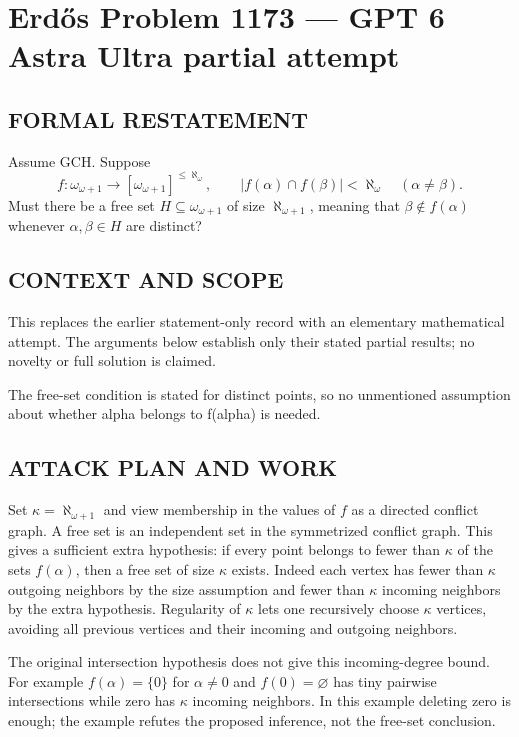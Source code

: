 \section*{Erd\H{o}s Problem 1173 --- GPT 6 Astra Ultra partial attempt}


\subsection*{FORMAL RESTATEMENT}
Assume GCH. Suppose
\[
f:\omega_{\omega+1}\longrightarrow[\omega_{\omega+1}]^{\leq\aleph_\omega},
\qquad |f(\alpha)\cap f(\beta)|<\aleph_\omega\quad(\alpha\ne\beta).
\]
Must there be a free set $H\subseteq\omega_{\omega+1}$ of size $\aleph_{\omega+1}$, meaning that $\beta\notin f(\alpha)$ whenever $\alpha,\beta\in H$ are distinct?

\subsection*{CONTEXT AND SCOPE}
This replaces the earlier statement-only record with an elementary mathematical attempt. The arguments below establish only their stated partial results; no novelty or full solution is claimed.

The free-set condition is stated for distinct points, so no unmentioned assumption about whether alpha belongs to f(alpha) is needed.

\subsection*{ATTACK PLAN AND WORK}
Set $\kappa=\aleph_{\omega+1}$ and view membership in the values of $f$ as a
directed conflict graph. A free set is an independent set in the symmetrized
conflict graph. This gives a sufficient extra hypothesis: if every point belongs
to fewer than $\kappa$ of the sets $f(\alpha)$, then a free set of size $\kappa$
exists. Indeed each vertex has fewer than $\kappa$ outgoing neighbors by the
size assumption and fewer than $\kappa$ incoming neighbors by the extra hypothesis.
Regularity of $\kappa$ lets one recursively choose $\kappa$ vertices, avoiding
all previous vertices and their incoming and outgoing neighbors.

The original intersection hypothesis does not give this incoming-degree bound.
For example $f(\alpha)=\{0\}$ for $\alpha\ne0$ and $f(0)=\varnothing$ has tiny
pairwise intersections while zero has $\kappa$ incoming neighbors. In this
example deleting zero is enough; the example refutes the proposed inference,
not the free-set conclusion.

